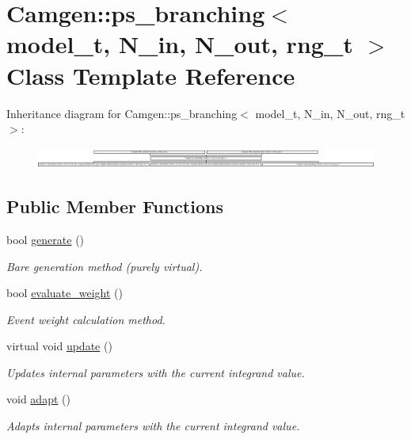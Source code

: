 \hypertarget{a00445}{}\section{Camgen\+:\+:ps\+\_\+branching$<$ model\+\_\+t, N\+\_\+in, N\+\_\+out, rng\+\_\+t $>$ Class Template Reference}
\label{a00445}
Inheritance diagram for Camgen\+:\+:ps\+\_\+branching$<$ model\+\_\+t, N\+\_\+in, N\+\_\+out, rng\+\_\+t $>$\+:\begin{figure}[H]
\begin{center}
\leavevmode
\includegraphics[height=0.673077cm]{a00445}
\end{center}
\end{figure}
\subsection*{Public Member Functions}
\begin{DoxyCompactItemize}
\item 
bool \hyperlink{a00445_afd6381ce5a2d653a8389c305460a6ecb}{generate} ()
\begin{DoxyCompactList}\small\item\em \textquotesingle{}Bare generation\textquotesingle{} method (purely virtual). \end{DoxyCompactList}\item 
\hypertarget{a00445_a91db958bf7e0933a35fbf2cb8b539065}{}bool \hyperlink{a00445_a91db958bf7e0933a35fbf2cb8b539065}{evaluate\+\_\+weight} ()\label{a00445_a91db958bf7e0933a35fbf2cb8b539065}

\begin{DoxyCompactList}\small\item\em Event weight calculation method. \end{DoxyCompactList}\item 
\hypertarget{a00445_a3a47ff8deefb4b049c1ed09592167d58}{}virtual void \hyperlink{a00445_a3a47ff8deefb4b049c1ed09592167d58}{update} ()\label{a00445_a3a47ff8deefb4b049c1ed09592167d58}

\begin{DoxyCompactList}\small\item\em Updates internal parameters with the current integrand value. \end{DoxyCompactList}\item 
\hypertarget{a00445_a6ab4ae7501d4ded1b484846b20d19e1c}{}void \hyperlink{a00445_a6ab4ae7501d4ded1b484846b20d19e1c}{adapt} ()\label{a00445_a6ab4ae7501d4ded1b484846b20d19e1c}

\begin{DoxyCompactList}\small\item\em Adapts internal parameters with the current integrand value. \end{DoxyCompactList}\end{DoxyCompactItemize}


